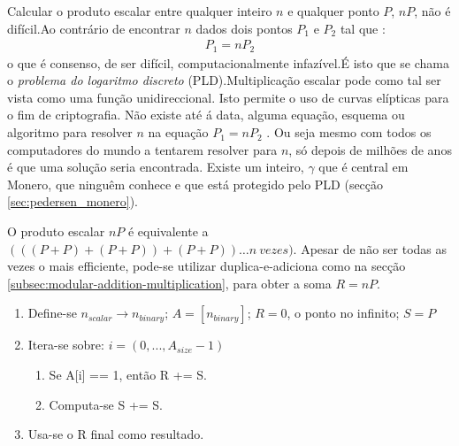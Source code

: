Calcular o produto escalar entre qualquer inteiro $n$ e qualquer ponto $P$, $nP$, não é difícil.\newline Ao contrário de encontrar $n$ dados dois pontos $P_1$ e $P_2$ tal que : 
\vspace{.375cm}
\begin{align*}
P_1 = n P_2
\end{align*}
o que é consenso, de ser difícil, computacionalmente infazível.\newline É isto que se chama o {\em problema do logaritmo discreto} (PLD).\newline Multiplicação escalar pode como tal ser vista como uma função unidireccional. Isto permite o uso de curvas elípticas para o fim de criptografia. Não existe até á data, alguma equação, esquema ou algoritmo para resolver $n$ na equação $P_1 = n P_2$ . Ou seja mesmo com todos os computadores do mundo a tentarem resolver para $n$, só depois de milhões de anos é que uma solução seria encontrada. Existe um inteiro, $\gamma$ que é central em Monero, que ninguêm conhece e que está protegido pelo PLD (secção \ref{sec:pedersen_monero}).     

O produto escalar $nP$ é equivalente a $(((P+P)+(P+P))+(P+P))…{n\ vezes})$. Apesar de não ser todas as vezes o mais efficiente, pode-se utilizar duplica-e-adiciona como na secção \ref{subsec:modular-addition-multiplication}, para obter a soma $R = n P$.  


\begin{enumerate}
	\item Define-se $n_{scalar} \rightarrow n_{binary}$; $A = [n_{binary}]$; $R = 0$, 
o ponto no infinito; $S = P$
	\item Itera-se sobre: $i = (0,...,A_{size} - 1)$
	\begin{enumerate}
		\item Se A[i] == 1, então R += S.
		\item Computa-se S += S.
	\end{enumerate}
	\item Usa-se o R final como resultado.
\end{enumerate}



